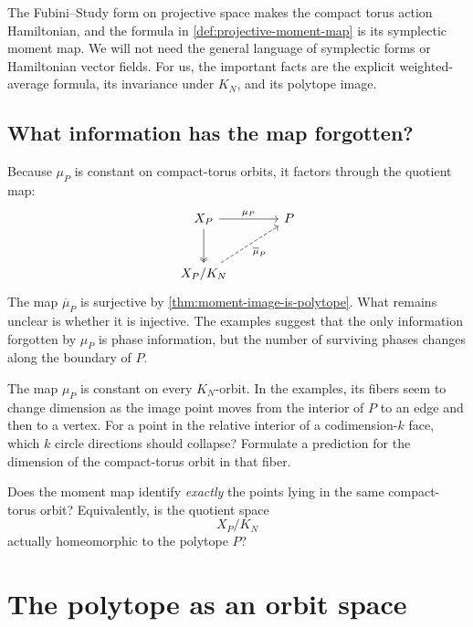 \begin{observation}
\label{obs:symplectic-moment-map}
The Fubini--Study form on projective space makes the compact torus
action Hamiltonian, and the formula in
\cref{def:projective-moment-map} is its symplectic moment map. We will
not need the general language of symplectic forms or Hamiltonian vector
fields. For us, the important facts are the explicit weighted-average
formula, its invariance under \(K_N\), and its polytope image.
\end{observation}

\clearpage
\subsection{What information has the map forgotten?}

Because \(\mu_P\) is constant on compact-torus orbits, it factors
through the quotient map:
\[
\begin{tikzcd}[column sep=large,row sep=large]
X_P \arrow[r,"\mu_P"] \arrow[d,two heads]
  & P \\
X_P/K_N \arrow[ur,dashed,"\overline{\mu}_P"'] & {}
\end{tikzcd}
\]
The map \(\overline{\mu}_P\) is surjective by
\cref{thm:moment-image-is-polytope}. What remains unclear is whether
it is injective. The examples suggest that the only information
forgotten by \(\mu_P\) is phase information, but the number of surviving
phases changes along the boundary of \(P\).

\begin{prediction}
The map \(\mu_P\) is constant on every \(K_N\)-orbit. In the examples,
its fibers seem to change dimension as the image point moves from the
interior of \(P\) to an edge and then to a vertex. For a point in the
relative interior of a codimension-\(k\) face, which \(k\) circle
directions should collapse? Formulate a prediction for the dimension
of the compact-torus orbit in that fiber.
\end{prediction}

\begin{guidingquestion}
Does the moment map identify \emph{exactly} the points lying in the same
compact-torus orbit? Equivalently, is the quotient space
\[
X_P/K_N
\]
actually homeomorphic to the polytope \(P\)?
\end{guidingquestion}

\section{The polytope as an orbit space}
\label{sec:polytope-orbit-space}

